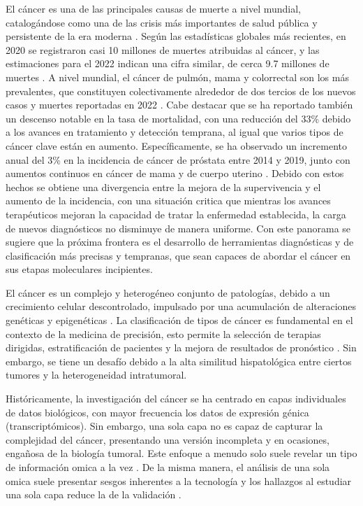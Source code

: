 \documentclass[preprint,number]{elsarticle}
\begin{document}
El cáncer es una de las principales causas de muerte a nivel mundial, catalogándose como una de las crisis más importantes de salud pública y persistente de la era moderna \cite{OMS_Cancer_2023_online}. Según las estadísticas globales más recientes, en 2020 se registraron casi 10 millones de muertes atribuidas al cáncer, y las estimaciones para el 2022 indican una cifra similar, de cerca 9.7 millones de muertes \cite{NCI_CancerStats_2025_online}. A nivel mundial, el cáncer de pulmón, mama y colorrectal son los más prevalentes, que constituyen colectivamente alrededor de dos tercios de los nuevos casos y muertes reportadas en 2022 \cite{siegel2023cancer}. Cabe destacar que se ha reportado también un descenso notable en la tasa de mortalidad, con una reducción del 33\% debido a los avances en tratamiento y detección temprana, al igual que varios tipos de cáncer clave están en aumento. Específicamente, se ha observado un incremento anual del 3\% en la incidencia de cáncer de próstata entre 2014 y 2019, junto con aumentos continuos en cáncer de mama y de cuerpo uterino \cite{dizon2024cancer}. Debido con estos hechos se obtiene una divergencia entre la mejora de la supervivencia y el aumento de la incidencia, con una situación critica que mientras los avances terapéuticos mejoran la capacidad de tratar la enfermedad establecida, la carga de nuevos diagnósticos no disminuye de manera uniforme. Con este panorama se sugiere que la próxima frontera es el desarrollo de herramientas diagnósticas y de clasificación más precisas y tempranas, que sean capaces de abordar el cáncer en sus etapas moleculares incipientes.

El cáncer es un complejo y heterogéneo conjunto de patologías, debido a un crecimiento celular descontrolado, impulsado por una acumulación de alteraciones genéticas y epigenéticas \cite{hanahan2011hallmarks}. La clasificación de tipos de cáncer es fundamental en el contexto de la medicina de precisión, esto permite la selección de terapias dirigidas, estratificación de pacientes y la mejora de resultados de pronóstico \cite{zhuang2021multi}. Sin embargo, se tiene un desafío debido a la alta similitud hispatológica entre ciertos tumores y la heterogeneidad intratumoral.

Históricamente, la investigación del cáncer se ha centrado en capas individuales de datos biológicos, con mayor frecuencia los datos de expresión génica (transcriptómicos). Sin embargo, una sola capa no es capaz de capturar la complejidad del cáncer, presentando una versión incompleta y en ocasiones, engañosa de la biología tumoral. Este enfoque a menudo solo suele revelar un tipo de información omica a la vez \cite{acharya2024comprehensive}.  De la misma manera, el análisis de una sola omica suele presentar sesgos inherentes a la tecnología y los hallazgos al estudiar una sola capa reduce la  de la validación \cite{massimino2023single}.
\end{document}

